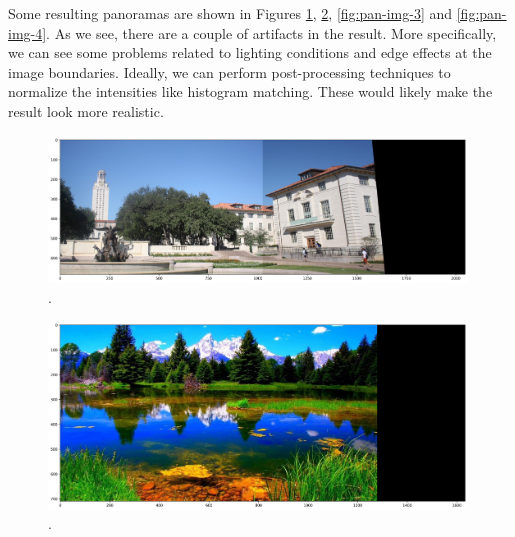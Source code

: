 \documentclass[10pt,twocolumn,letterpaper]{article}
\begin{document}
Some resulting panoramas are shown in Figures \ref{fig:pan-img-1}, \ref{fig:pan-img-2}, \ref{fig:pan-img-3} and \ref{fig:pan-img-4}. As we see, there are a couple of artifacts in the result. More specifically, we can see some problems related to lighting conditions and edge effects at the image boundaries. Ideally, we can perform post-processing techniques to normalize the intensities like histogram matching. These would likely make the result look more realistic.

\begin{figure}
\begin{center}
	\includegraphics[width=0.99\textwidth]{pics/horizontal_panorama_img_1}
	\caption{. \label{fig:pan-img-1}}   
\end{center} 
\end{figure}

\begin{figure}
\begin{center}
	\includegraphics[width=0.99\textwidth]{pics/horizontal_panorama_img_2}
	\caption{. \label{fig:pan-img-2}}   
\end{center} 
\end{figure}
\end{document}
